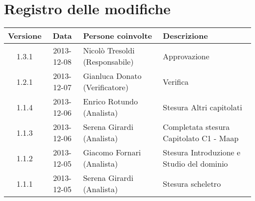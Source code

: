 \section*{Registro delle modifiche}

\small{
\begin{tabularx}{\textwidth}{|c|c|l|X|}
 \hline \textbf{Versione} & \textbf{Data} & \textbf{Persone coinvolte} & \textbf{Descrizione} \\

 
 \hline 1.3.1 & 2013-12-08 & Nicolò Tresoldi (Responsabile) & Approvazione \\

 \hline 1.2.1 & 2013-12-07 & Gianluca Donato (Verificatore) & Verifica \\

 \hline 1.1.4 & 2013-12-06 & Enrico Rotundo (Analista) & Stesura Altri capitolati \\

 \hline 1.1.3 & 2013-12-06 & Serena Girardi (Analista) & Completata stesura Capitolato C1 - Maap \\

 \hline 1.1.2 & 2013-12-05 & Giacomo Fornari (Analista) & Stesura Introduzione e Studio del dominio \\
 
 \hline 1.1.1 & 2013-12-05 & Serena Girardi (Analista) & Stesura scheletro \\
 
 \hline
\end{tabularx}
}
